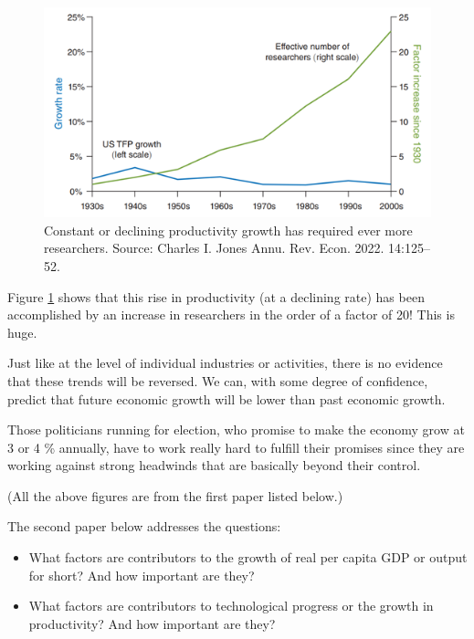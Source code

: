 \documentclass[
]{book}
\providecommand{\tightlist}{%
  \setlength{\itemsep}{0pt}\setlength{\parskip}{0pt}}
\begin{document}
\begin{figure}

{\centering \includegraphics[width=1\linewidth]{img/growth/moore20} 

}

\caption{Constant or declining productivity growth has required ever more researchers. Source: Charles I. Jones Annu. Rev. Econ. 2022. 14:125–52.}\label{fig:growth20}
\end{figure}

Figure \ref{fig:growth20} shows that this rise in productivity (at a declining rate) has been accomplished by an increase in researchers in the order of a factor of 20! This is huge.

Just like at the level of individual industries or activities, there is no evidence that these trends will be reversed. We can, with some degree of confidence, predict that future economic growth will be lower than past economic growth.

Those politicians running for election, who promise to make the economy grow at 3 or 4 \% annually, have to work really hard to fulfill their promises since they are working against strong headwinds that are basically beyond their control.

(All the above figures are from the first paper listed below.)

The second paper below addresses the questions:

\begin{itemize}
\tightlist
\item
  What factors are contributors to the growth of real per capita GDP or output for short? And how important are they?
\item
  What factors are contributors to technological progress or the growth in productivity? And how important are they?
\end{itemize}
\end{document}

